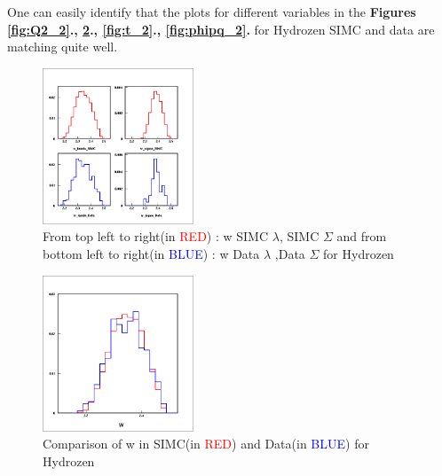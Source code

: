 \documentclass[aps,11pt]{revtex4}
\begin{document}
\newpage
\noindent
One can easily identify that the plots for different variables in the \textbf{Figures \ref{fig:Q2_2}., \ref{fig:w_2}., \ref{fig:t_2}., \ref{fig:phipq_2}.} for Hydrozen SIMC and data are matching quite well.
\begin{figure}[h]
	\centering
		\includegraphics[width=0.40\textwidth]{w_1.png}
	\caption{From top left to right(in \textcolor{red}{RED}) : w SIMC $\lambda$, SIMC $\Sigma$ and from bottom left to right(in \textcolor{blue}{BLUE}) : w Data $\lambda$  ,Data $\Sigma$ for Hydrozen}
	\label{fig:w_1}
\end{figure}
\begin{figure}[h]
	\centering
		\includegraphics[width=0.40\textwidth]{w_2.png}
	\caption{Comparison of w in SIMC(in \textcolor{red}{RED}) and Data(in \textcolor{blue}{BLUE}) for Hydrozen}
	\label{fig:w_2}
\end{figure}

\newpage
\end{document}
